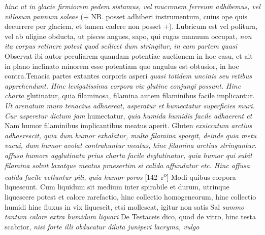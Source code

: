 \textit{hinc ut in glacie firmiorem pedem sistamus, vel mucronem ferreum\protect{} adhibemus, vel villosum pannum soleae } (+ NB. posset adhiberi instrumentum, cuius ope quis decurrere per glaciem, et tamen cadere non posset +). Lubricum\protect{} est vel politura, vel ab uligine obducta, ut pisces angues, sapo, qui rugas manuum occupat, \textit{non ita corpus retinere potest quod scilicet dum stringitur, in eam partem quasi } Observat ibi autor peculiarem quandam potentiae auctionem in hoc casu, et ait in plano inclinato minorem esse potentiam quo angulus est obtusior, in hoc contra.Tenacia partes extantes corporis asperi \textit{quasi totidem uncinis seu retibus apprehendunt. Hinc levigatissima corpora vix glutine conjungi possunt. Hinc charta } glutinatur, quia filaminosa, filamina autem filaminibus facile implicantur. \textit{Ut arenatum muro tenacius adhaereat, asperatur et humectatur superficies muri. Cur asperetur dictum jam } humectatur, \textit{quia humida humidis facile adhaerent et
} Nam humor filaminibus implicantibus meatus aperit. Gluten \textit{exsiccatum arctius adhaerescit,
quia dum humor exhalatur, multa filamina spargit,
deinde quia metu vacui, dum humor avolat contrahuntur meatus,
hinc filamina arctius stringuntur.
affuso humore agglutinata prius charta facile deglutinatur,
quia humor qui subit filamina solvit laxatque meatus praesertim si calida affundatur etc.
Hinc affusa calida facile velluntur pili\protect{}, quia humor}
\textit{poros }
[142~r\textsuperscript{o}]
\pend%
\count{}
\count{}
\pstart%
%
%
%
% 
 Modi quibus corpora liquescunt. Cum liquidum sit medium inter spirabile et durum, utrinque liquescere potest et calore rarefactio, hinc collectio homogeneorum, hinc collectio humidi  hinc fluxus in  vix liquescit, etsi mollescat, igitur non satis  Sal \textit{summo tantum calore extra humidum liquari } De Testaceis dico, quod de vitro, hinc testa scabrior, \textit{nisi forte illi obducatur diluta juniperi lacryma\protect{}, vulgo}
